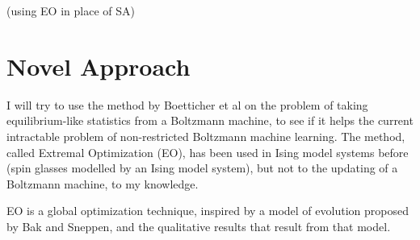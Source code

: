 \documentclass[12pt]{article}
\begin{document}
  (using EO in place of SA)


\section{} %

\section{} %

\section{Novel Approach}

I will try to use the method by Boetticher et al on the problem of taking equilibrium-like statistics from a Boltzmann machine, to see if it helps the current intractable problem of non-restricted Boltzmann machine learning. The method, called Extremal Optimization (EO), has been used in Ising model systems before (spin glasses modelled by an Ising model system), but not to the updating of a Boltzmann machine, to my knowledge. %

EO is a global optimization technique, inspired by a model of evolution proposed by Bak and Sneppen, and the qualitative results that result from that model. %


\end{document}
